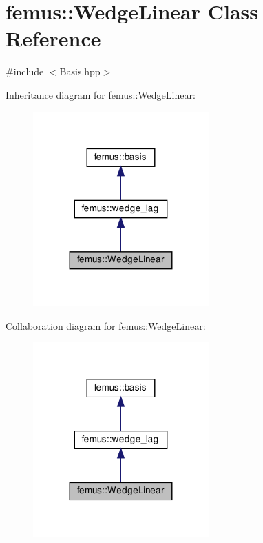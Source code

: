 \hypertarget{classfemus_1_1_wedge_linear}{}\section{femus\+:\+:Wedge\+Linear Class Reference}
\label{classfemus_1_1_wedge_linear}


{\ttfamily \#include $<$Basis.\+hpp$>$}



Inheritance diagram for femus\+:\+:Wedge\+Linear\+:
\nopagebreak
\begin{figure}[H]
\begin{center}
\leavevmode
\includegraphics[width=191pt]{classfemus_1_1_wedge_linear__inherit__graph}
\end{center}
\end{figure}


Collaboration diagram for femus\+:\+:Wedge\+Linear\+:
\nopagebreak
\begin{figure}[H]
\begin{center}
\leavevmode
\includegraphics[width=191pt]{classfemus_1_1_wedge_linear__coll__graph}
\end{center}
\end{figure}
